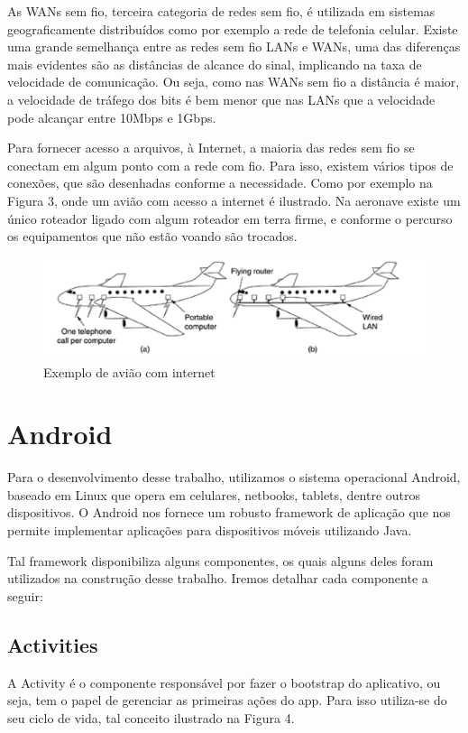 \documentclass[12pt, %
openright, 
oneside,
a4paper,
brazil]{facom-ufu-abntex2}
\begin{document}
As WANs sem fio, terceira categoria de redes sem fio, é utilizada em sistemas geograficamente distribuídos como por exemplo a rede de telefonia celular. Existe uma grande semelhança entre as redes sem fio LANs e WANs, uma das diferenças mais evidentes são as distâncias de alcance do sinal, implicando na taxa de velocidade de comunicação. Ou seja, como nas WANs sem fio a distância é maior, a velocidade de tráfego dos bits é bem menor que nas LANs que a velocidade pode alcançar entre 10Mbps e 1Gbps.

Para fornecer acesso a arquivos, à Internet, a maioria das redes sem fio se conectam  em algum ponto com a rede com fio. Para isso, existem vários tipos de conexões, que são desenhadas conforme a necessidade. Como por exemplo na Figura 3, onde um avião com acesso a internet é ilustrado. Na aeronave existe um único roteador ligado com algum roteador em terra firme, e conforme o percurso os equipamentos  que não estão voando são trocados.

\begin{figure}[hbt]
  \includegraphics[scale=0.9]{aviao}
  \caption{Exemplo de avião com internet \cite{tanenbaum2003redes}}
\end{figure}



\section{Android}

	Para o desenvolvimento desse trabalho, utilizamos o sistema operacional Android, baseado em Linux que opera em celulares, netbooks, tablets, dentre outros dispositivos. O Android nos fornece um robusto framework de aplicação que nos permite implementar aplicações para dispositivos móveis utilizando Java.
	

	Tal framework disponibiliza alguns componentes, os quais alguns deles foram utilizados na construção desse trabalho.
	Iremos detalhar cada componente a seguir:
	\cite{googleand}
	
	\subsection{Activities}
	A Activity é o componente responsável por fazer o bootstrap do aplicativo, ou seja, tem o papel de gerenciar as primeiras ações do app. Para isso utiliza-se do seu ciclo de vida, tal conceito ilustrado na Figura 4.\
	
\end{document}
